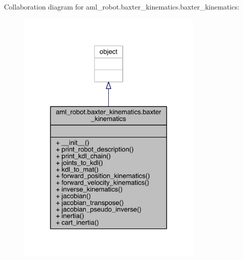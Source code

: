 Collaboration diagram for aml\+\_\+robot.\+baxter\+\_\+kinematics.\+baxter\+\_\+kinematics\+:
\nopagebreak
\begin{figure}[H]
\begin{center}
\leavevmode
\includegraphics[width=254pt]{classaml__robot_1_1baxter__kinematics_1_1baxter__kinematics__coll__graph}
\end{center}
\end{figure}

